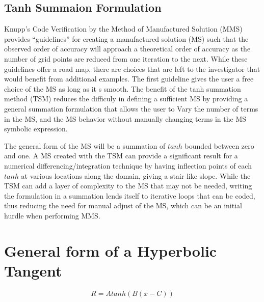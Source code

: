 \subsection{Tanh Summaion Formulation}
Knupp's Code Verification by the Method of Manufactured Solution (MMS) provides 
``guidelines'' for creating a manufactured solution (MS) such that the observed
order of accuracy will approach a theoretical order of accuracy as the number
of grid points are reduced from one iteration to the next. While these guidelines
offer a road map, there are choices that are left to the investigator that would
benefit from additional examples. The first guideline gives the user a free
choice of the MS as long as it s smooth. The benefit of the tanh summation method 
(TSM) reduces the difficuly in defining a sufficient MS by providing 
a general summation formulation that allows the user to Vary the number of 
terms in the MS, and the MS behavior without manually changing terms in the MS
symbolic expression. 

The general form of the MS will be a summation of $tanh$ bounded between zero
and one. A MS created with the TSM can provide a significant result for
a numerical differencing/integration technique by having inflection points of each
$tanh$ at various locations along the domain, giving a stair like slope.
While the TSM can add a layer of complexity to the MS that may not be needed, 
writing the formulation in a summation lends itself to iterative loops that can 
be coded, thus reducing the need for manual adjust of the MS, 
which can be an initial hurdle when performing MMS.


\section{General form of a Hyperbolic Tangent}

\begin{equation}
    R = A tanh(B(x-C)) 
    \label{eqn:1}
\end{equation}

